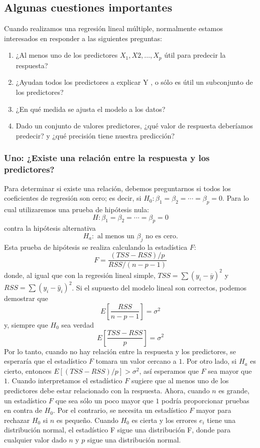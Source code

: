 \subsection{Algunas cuestiones importantes}

Cuando realizamos una regresión lineal múltiple, normalmente estamos interesados en responder a las siguientes preguntas:

\begin{enumerate}[1.]
    \item ¿Al menos uno de los predictores $X_1,X2, \ldots , X_p$ útil para predecir la respuesta?
    \item ¿Ayudan todos los predictores a explicar Y , o sólo es útil un subconjunto de los predictores?
    \item ¿En qué medida se ajusta el modelo a los datos?
    \item  Dado un conjunto de valores predictores, ¿qué valor de respuesta deberíamos predecir? y ¿qué precisión tiene nuestra predicción?
\end{enumerate}

\subsubsection{Uno: ¿Existe una relación entre la respuesta y los predictores?}
Para determinar si existe una relación, debemos preguntarnos si todos los coeficientes de regresión son cero; es decir, si $H_0:\beta_1=\beta_2=\cdots=\beta_p=0$. Para lo cual utilizaremos una prueba de hipótesis nula:
$$H:\beta_1=\beta_2=\cdots=\beta_p=0$$
contra la hipótesis alternativa
$$H_a: \text{ al menos un } \beta_j \mbox{ no es cero}.$$
Esta prueba de hipótesis se realiza calculando la estadística $F$:
$$F=\dfrac{(TSS-RSS)/p}{RSS/(n-p-1)}$$
donde, al igual que con la regresión lineal simple, $TSS=\sum \left(y_i-\overline{y}\right)^2$ y $RSS=\sum \left(y_i-\hat{y}_i\right)^2$. Si el supuesto del modelo lineal son correctos, podemos demostrar que
$$E\left[\dfrac{RSS}{n-p-1}\right]=\sigma^2$$
y, siempre que $H_0$ sea verdad
$$E\left[\dfrac{TSS-RSS}{p}\right]=\sigma^2$$
Por lo tanto, cuando no hay relación entre la respuesta y los predictores, se esperaría que el estadístico $F$ tomara un valor cercano a $1$. Por otro lado, si $H_a$ es cierto, entonces $E\left[(TSS-RSS)/p\right]>\sigma^2$, así esperamos que $F$ sea mayor que $1$. Cuando interpretamos el estadístico $F$ sugiere que al menos uno de los predictores debe estar relacionado con la respuesta. Ahora, cuando $n$ es grande, un estadístico $F$ que sea sólo un poco mayor que $1$ podría proporcionar pruebas en contra de $H_0$. Por el contrario, se necesita un estadístico $F$ mayor para rechazar $H_0$ si $n$ es pequeño. Cuando $H_0$ es cierta y los errores $e_i$ tiene una distribución normal, el estadístico F sigue una distribución F, donde para cualquier valor dado $n$ y $p$ sigue una distribución normal.\\

